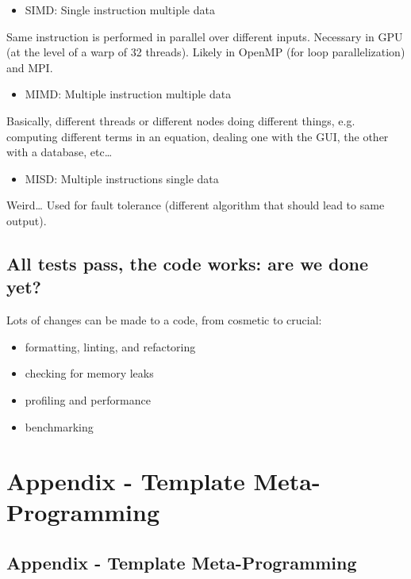 \begin{itemize}
\itemsep1pt\parskip0pt
\item
  SIMD: Single instruction multiple data
\end{itemize}

Same instruction is performed in parallel over different inputs.
Necessary in GPU (at the level of a warp of 32 threads). Likely in
OpenMP (for loop parallelization) and MPI.

\begin{itemize}
\itemsep1pt\parskip0pt
\item
  MIMD: Multiple instruction multiple data
\end{itemize}

Basically, different threads or different nodes doing different things,
e.g. computing different terms in an equation, dealing one with the GUI,
the other with a database, etc\ldots{}

\begin{itemize}
\itemsep1pt\parskip0pt
\item
  MISD: Multiple instructions single data
\end{itemize}

Weird\ldots{} Used for fault tolerance (different algorithm that should
lead to same output).

\subsection{All tests pass, the code works: are we done
yet?}\label{all-tests-pass-the-code-works-are-we-done-yet}

Lots of changes can be made to a code, from cosmetic to crucial:

\begin{itemize}
\itemsep1pt\parskip0pt
\item
  formatting, linting, and refactoring
\item
  checking for memory leaks
\item
  profiling and performance
\item
  benchmarking
\end{itemize}

\section{Appendix - Template
Meta-Programming}\label{appendix---template-meta-programming}

\subsection{Appendix - Template
Meta-Programming}\label{appendix---template-meta-programming-1}

